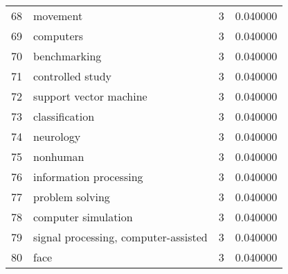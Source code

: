 \begin{tabular}{llrr}
68 &                                 movement &           3 &    0.040000 \\
69 &                                computers &           3 &    0.040000 \\
70 &                             benchmarking &           3 &    0.040000 \\
71 &                         controlled study &           3 &    0.040000 \\
72 &                   support vector machine &           3 &    0.040000 \\
73 &                           classification &           3 &    0.040000 \\
74 &                                neurology &           3 &    0.040000 \\
75 &                                 nonhuman &           3 &    0.040000 \\
76 &                   information processing &           3 &    0.040000 \\
77 &                          problem solving &           3 &    0.040000 \\
78 &                      computer simulation &           3 &    0.040000 \\
79 &     signal processing, computer-assisted &           3 &    0.040000 \\
80 &                                     face &           3 &    0.040000 \\
\bottomrule
\end{tabular}
